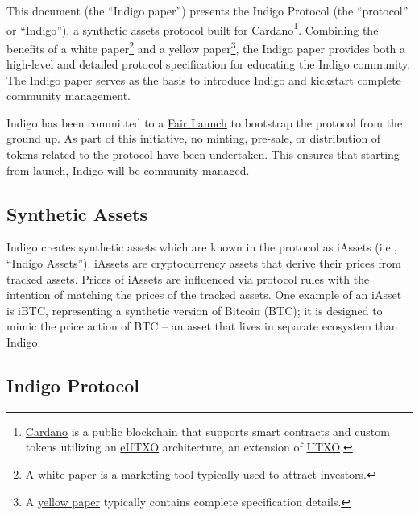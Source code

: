 \documentclass{article}
\begin{document}
\begin{sloppypar}
This document (the ``Indigo paper'') presents the Indigo Protocol (the
``protocol'' or ``Indigo''), a synthetic assets protocol built for
Cardano\footnote{\href{https://www.coinbase.com/learn/crypto-basics/what-is-cardano}{Cardano}
  is a public blockchain that supports smart contracts and custom tokens
  utilizing an
  \href{https://docs.cardano.org/plutus/eutxo-explainer/}{eUTXO}
  architecture, an extension of
  \href{https://unchained.com/blog/what-is-a-utxo-bitcoin/}{UTXO}.}.
Combining the benefits of a white paper\footnote{A
  \href{https://cointelegraph.com/funding-for-beginners/what-is-a-white-paper-a-beginners-guide-on-how-to-write-and-format-one}{white
  paper} is a marketing tool typically used to attract investors.} and a
yellow paper\footnote{A
  \href{https://wikicryptocoins.com/currency/Yellow_Paper}{yellow paper}
  typically contains complete specification details.}, the Indigo paper
provides both a high-level and detailed protocol specification for
educating the Indigo community. The Indigo paper serves as the basis to
introduce Indigo and kickstart complete community management.

Indigo has been committed to a \protect\hyperlink{fair-launch}{Fair
Launch} to bootstrap the protocol from the ground up. As part of this
initiative, no minting, pre-sale, or distribution of tokens related to
the protocol have been undertaken. This ensures that starting from
launch, Indigo will be community managed.

\hypertarget{synthetic-assets}{%
\subsection{Synthetic Assets}\label{synthetic-assets}}

Indigo creates synthetic assets which are known in the protocol as
iAssets (i.e., ``Indigo Assets''). iAssets are cryptocurrency assets
that derive their prices from tracked assets. Prices of iAssets are
influenced via protocol rules with the intention of matching the prices
of the tracked assets. One example of an iAsset is iBTC, representing a
synthetic version of Bitcoin (BTC); it is designed to mimic the price
action of BTC -- an asset that lives in separate ecosystem than Indigo.

\hypertarget{indigo-protocol}{%
\subsection{Indigo Protocol}\label{indigo-protocol}}


\end{sloppypar}
\end{document}
